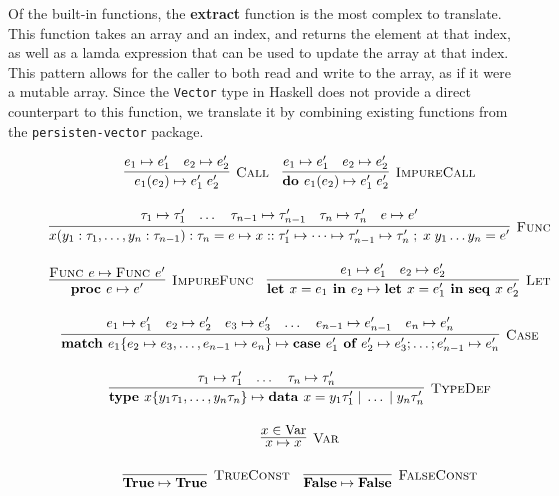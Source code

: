 \documentclass[a4paper,UKenglish,cleveref, autoref, thm-restate]{template/lipics-v2021}
\begin{document}
Of the built-in functions, the \textbf{extract} function is the most complex to translate. This function takes an array and an index, and returns the element at that index, as well as a lamda expression that can be used to update the array at that index. This pattern allows for the caller to both read and write to the array, as if it were a mutable array. Since the \verb|Vector| type in Haskell does not provide a direct counterpart to this function, we translate it by combining existing functions from the \verb|persisten-vector| package.
\begin{figure}
  \centering
  \begin{gather*}
    \infer[\textsc{Call}]%
    {e_1 (e_2) \mapsto e_1' \; e_2'}%
    {e_1 \mapsto e_1' & e_2 \mapsto e_2'} \quad
    \infer[\textsc{ImpureCall}]%
    {\textbf{do } e_1 (e_2) \mapsto e_1' \; e_2'}%
    {e_1 \mapsto e_1' & e_2 \mapsto e_2'} \\[1em]
    \infer[\textsc{Func}]%
    {x(y_1: \tau_1,\dots,y_n: \tau_{n-1}): \tau_n = e \mapsto x :: \tau_1' \mapsto \dots \mapsto \tau_{n-1}' \mapsto \tau_n'\; ; \; x \; y_1 \dots y_n = e'}%
    {\tau_1 \mapsto \tau_1' & \dots & \tau_{n-1} \mapsto \tau_{n-1}' & \tau_n \mapsto \tau_n' & e \mapsto e'} \\[1em]
    \infer[\textsc{ImpureFunc}]%
    {\textbf{proc } e \mapsto e'}%
    {\textsc{Func } e \mapsto \textsc{Func } e'} \quad
    \infer[\textsc{Let}]%
    {\textbf{let } x = e_1 \textbf{ in } e_2 \mapsto \textbf{let } x = e_1' \textbf{ in seq } x \; e_2'}%
    {e_1 \mapsto e_1' & e_2 \mapsto e_2'} \\[1em]
    \infer[\textsc{Case}]%
    {\textbf{match } e_1 \{ e_2 \mapsto e_3,\dots,e_{n-1} \mapsto e_n\} \mapsto \textbf{case } e_1' \textbf{ of } e_2' \mapsto e_3';\dots;e_{n-1}' \mapsto e_n'}%
    {e_1 \mapsto e_1' & e_2 \mapsto e_2' & e_3 \mapsto e_3' & \dots & e_{n-1} \mapsto e_{n-1}' & e_n \mapsto e_n'} \\[1em]
    \infer[\textsc{TypeDef}]%
    {\textbf{type } x \{y_1 \tau_1,\dots,y_n \tau_n\} \mapsto \textbf{data } x = y_1 \tau_1' \; | \; \dots \; | \; y_n \tau_n'}%
    {\tau_1 \mapsto \tau_1' & \dots & \tau_n \mapsto \tau_n'} \\[1em]
    \infer[\textsc{Var}]%
    {x \mapsto x}%
    {x \in \text{Var}} \\[1em]
    \infer[\textsc{TrueConst}]%
    {\textbf{True} \mapsto \textbf{True}}%
    {} \quad
    \infer[\textsc{FalseConst}]%
    {\textbf{False} \mapsto \textbf{False}}%
    {} \\[1em]

\end{gather*}
\end{figure}
\end{document}
